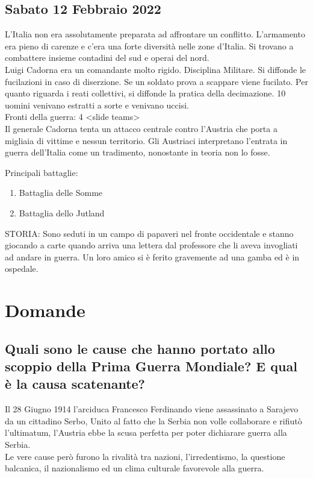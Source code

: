 \documentclass{article}
\begin{document}
\subsection{Sabato 12 Febbraio 2022}
L'Italia non era assolutamente preparata ad affrontare un conflitto. L'armamento era pieno di carenze e c'era una forte diversità nelle zone d'Italia. Si trovano a combattere insieme contadini del sud e operai del nord.
\\
Luigi Cadorna era un comandante molto rigido. Disciplina Militare. Si diffonde le fucilazioni in caso di diserzione. Se un soldato prova a scappare viene fucilato. Per quanto riguarda i reati collettivi, si diffonde la pratica della decimazione. 10 uomini venivano estratti a sorte e venivano uccisi.
\\
Fronti della guerra: 4 <slide teams>
\\
Il generale Cadorna tenta un attacco centrale contro l'Austria che porta a migliaia di vittime e nessun territorio.
Gli Austriaci interpretano l'entrata in guerra dell'Italia come un tradimento, nonostante in teoria non lo fosse.

Principali battaglie:
\begin{enumerate}
    \item Battaglia delle Somme
    \item Battaglia dello Jutland
\end{enumerate}

STORIA:
Sono seduti in un campo di papaveri nel fronte occidentale e stanno giocando a carte quando arriva una lettera dal professore che li aveva invogliati ad andare in guerra. Un loro amico si è ferito gravemente ad una gamba ed è in ospedale.

\section{Domande}

\subsection{Quali sono le cause che hanno portato allo scoppio della Prima Guerra Mondiale? E qual è la causa scatenante?}
Il 28 Giugno 1914 l'arciduca Francesco Ferdinando viene assassinato a Sarajevo da un cittadino Serbo, Unito al fatto che
la Serbia non volle collaborare e rifiutò l'ultimatum, l'Austria ebbe la scusa perfetta per poter dichiarare guerra
alla Serbia.\\
Le vere cause però furono la rivalità tra nazioni, l'irredentismo, la questione balcanica, il nazionalismo ed un clima culturale
favorevole alla guerra.
\end{document}
